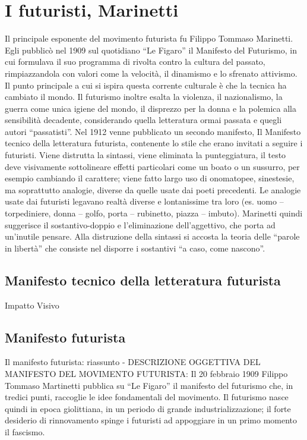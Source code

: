 \documentclass[10pt]{report}
\begin{document}
		\section[Marinetti]{I futuristi, Marinetti}
		Il principale esponente del movimento futurista fu Filippo Tommaso Marinetti. Egli pubblicò nel 1909 sul quotidiano “Le Figaro” il Manifesto del Futurismo, in cui formulava il suo programma di rivolta contro la cultura del passato, rimpiazzandola con valori come la velocità, il dinamismo e lo sfrenato attivismo. Il punto principale a cui si ispira questa corrente culturale è che la tecnica ha cambiato il mondo. Il futurismo inoltre esalta la violenza, il nazionalismo, la guerra come unica igiene del mondo, il disprezzo per la donna e la polemica alla sensibilità decadente, considerando quella letteratura ormai passata e quegli autori “passatisti”.
		Nel 1912 venne pubblicato un secondo manifesto, Il Manifesto tecnico della letteratura futurista, contenente lo stile che erano invitati a seguire i futuristi. Viene distrutta la sintassi, viene eliminata la punteggiatura, il testo deve visivamente sottolineare effetti particolari come un boato o un sussurro, per esempio cambiando il carattere; viene fatto largo uso di onomatopee, sinestesie, ma soprattutto analogie, diverse da quelle usate dai poeti precedenti. Le analogie usate dai futuristi legavano realtà diverse e lontanissime tra loro (es. uomo – torpediniere, donna – golfo, porta – rubinetto, piazza – imbuto). Marinetti quindi suggerisce il sostantivo-doppio e l’eliminazione dell’aggettivo, che porta ad un’inutile pensare. Alla distruzione della sintassi si accosta la teoria delle “parole in libertà” che consiste nel disporre i sostantivi “a caso, come nascono”.
		
		\subsection[Manifesto Tecnico]{Manifesto tecnico della letteratura futurista} Impatto Visivo
		
		\subsection[Manifesto Futurista]{Manifesto futurista}
		Il manifesto futurista: riassunto - DESCRIZIONE OGGETTIVA DEL MANIFESTO DEL MOVIMENTO FUTURISTA: Il 20 febbraio 1909 Filippo Tommaso Martinetti pubblica su “Le Figaro” il manifesto del futurismo che, in tredici punti, raccoglie le idee fondamentali del movimento. Il futurismo nasce quindi in epoca giolittiana, in un periodo di grande industrializzazione; il forte desiderio di rinnovamento spinge i futuristi ad appoggiare in un primo momento il fascismo. 
		
\end{document}
